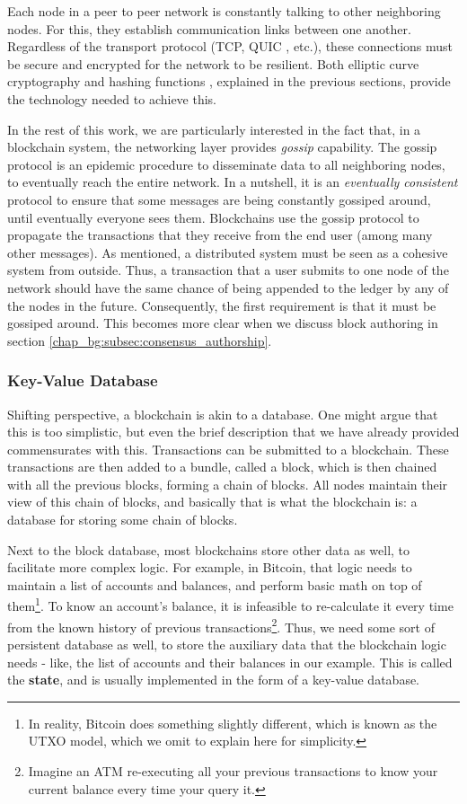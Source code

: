 Each node in a peer to peer network is constantly talking to other neighboring nodes. For this, they
establish communication links between one another. Regardless of the transport protocol (TCP, QUIC
\cite{carlucciHTTPUDPExperimental2015}, etc.), these connections must be secure and encrypted for
the network to be resilient. Both elliptic curve cryptography and hashing functions , explained in the
previous sections, provide the technology needed to achieve this.

In the rest of this work, we are particularly interested in the fact that, in a blockchain system,
the networking layer provides \textit{gossip} capability. The gossip protocol is an epidemic
procedure to disseminate data to all neighboring nodes, to eventually reach the entire network. In a
nutshell, it is an \textit{eventually consistent} protocol to ensure that some messages are being
constantly gossiped around, until eventually everyone sees them. Blockchains use the gossip protocol
to propagate the transactions that they receive from the end user (among many other messages). As
mentioned, a distributed system must be seen as a cohesive system from outside. Thus, a transaction
that a user submits to one node of the network should have the same chance of being appended to the
ledger by any of the nodes in the future. Consequently, the first requirement is that it must be gossiped
around. This becomes more clear when we discuss block authoring in section
\ref{chap_bg:subsec:consensus_authorship}.

\subsubsection{Key-Value Database} \label{chap_bg:subsec:kvdb}

Shifting perspective, a blockchain is akin to a database. One might argue that this is too
simplistic, but even the brief description that we have already provided commensurates with this.
Transactions can be submitted to a blockchain. These transactions are then added to a bundle, called
a block, which is then chained with all the previous blocks, forming a chain of blocks. All nodes
maintain their view of this chain of blocks, and basically that is what the blockchain is: a
database for storing some chain of blocks.

Next to the block database, most blockchains store other data as well, to facilitate more complex
logic. For example, in Bitcoin, that logic needs to maintain a list of accounts and balances, and
perform basic math on top of them\footnote{In reality, Bitcoin does something slightly different,
which is known as the UTXO model, which we omit to explain here for simplicity.}. To know an account's
balance, it is infeasible to re-calculate it every time from the known history of previous
transactions\footnote{Imagine an ATM re-executing all your previous transactions to know your
current balance every time your query it.}. Thus, we need some sort of persistent database as well,
to store the auxiliary data that the blockchain logic needs - like, the list of accounts and their balances in our
example. This is called the \textbf{state}, and is usually implemented in the form of a key-value
database.

